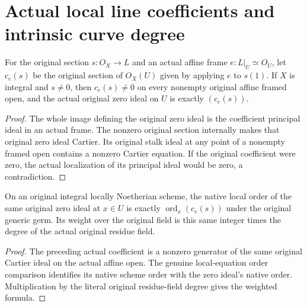 \section{Actual local line coefficients and intrinsic curve degree}

\begin{definition}
\label{def:fc-original-line-section-frame-coefficient}
\leanok
{}
For the original section $s:O_X\to L$ and an actual affine frame
$e:L|_U\simeq O_U$, let $c_e(s)$ be the original section of $O_X(U)$
given by applying $e$ to $s(1)$. If $X$ is integral and $s\ne0$, then
$c_e(s)\ne0$ on every nonempty original affine framed open, and the
actual original zero ideal on $U$ is exactly $(c_e(s))$.
\end{definition}
\begin{proof}
The whole image defining the original zero ideal is the coefficient
principal ideal in an actual frame. The nonzero original section
internally makes that original zero ideal Cartier. Its original stalk
ideal at any point of a nonempty framed open contains a nonzero
Cartier equation. If the original coefficient were zero, the actual
localization of its principal ideal would be zero, a contradiction.
\end{proof}

\begin{theorem}
\label{thm:fc-original-line-section-frame-order}
\leanok
{}
On an original integral locally Noetherian scheme, the native local
order of the same original zero ideal at $x\in U$ is exactly
$\operatorname{ord}_x(c_e(s))$ under the original generic germ. Its
weight over the original field is this same integer times the degree
of the actual original residue field.
\end{theorem}
\begin{proof}
The preceding actual coefficient is a nonzero generator of the same
original Cartier ideal on the actual affine open. The genuine
local-equation order comparison identifies its native scheme order
with the zero ideal's native order. Multiplication by the literal
original residue-field degree gives the weighted formula.
\end{proof}

